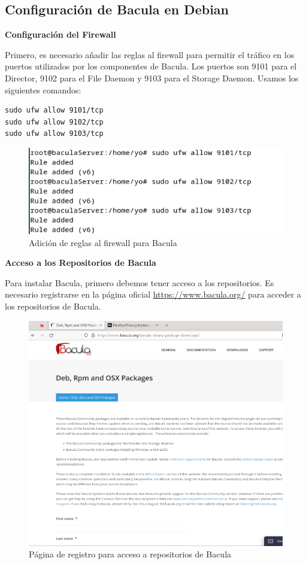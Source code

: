 \subsection{Configuración de Bacula en Debian}

\textbf{Configuración del Firewall}
\medskip

Primero, es necesario añadir las reglas al firewall para permitir el tráfico en los puertos utilizados por los componentes de Bacula. Los puertos son 9101 para el Director, 9102 para el File Daemon y 9103 para el Storage Daemon. Usamos los siguientes comandos:
\begin{verbatim}
sudo ufw allow 9101/tcp
sudo ufw allow 9102/tcp
sudo ufw allow 9103/tcp
\end{verbatim}

\begin{figure}[H]
    \centering
    \includegraphics[width=0.5\linewidth]{instalacionBacula/puertosBaCULAufw.png}
    \caption{Adición de reglas al firewall para Bacula}
\end{figure}

\textbf{Acceso a los Repositorios de Bacula}\medskip

Para instalar Bacula, primero debemos tener acceso a los repositorios. Es necesario registrarse en la página oficial \url{https://www.bacula.org/} para acceder a los repositorios de Bacula.

\begin{figure}[H]
    \centering
    \includegraphics[width=0.5\linewidth]{instalacionBacula/registroBacula.png}
    \caption{Página de registro para acceso a repositorios de Bacula}
\end{figure}

